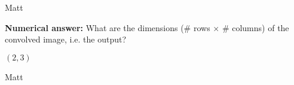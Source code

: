 \begin{parts}
\begin{subparts}
        \begin{soln}
        \end{soln}
        \begin{qauthor} Matt \end{qauthor}

    \subpart[1] \textbf{Numerical answer:} What are the dimensions (\# rows $\times$ \# columns) of the convolved image, i.e. the output?
        \begin{tcolorbox}[fit,height=2cm, width=7cm, blank, borderline={1pt}{-2pt}]
        \end{tcolorbox}
        \begin{soln}
            $(2, 3)$
        \end{soln}
        \begin{qauthor} Matt \end{qauthor}
        

    \end{subparts}

\end{parts}